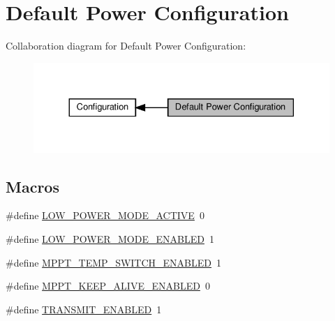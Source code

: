 \hypertarget{group__defines__default__power__configuration}{}\section{Default Power Configuration}
\label{group__defines__default__power__configuration}
Collaboration diagram for Default Power Configuration\+:
\nopagebreak
\begin{figure}[H]
\begin{center}
\leavevmode
\includegraphics[width=330pt]{group__defines__default__power__configuration}
\end{center}
\end{figure}
\subsection*{Macros}
\begin{DoxyCompactItemize}
\item 
\#define \hyperlink{group__defines__default__power__configuration_gad0d7265d491052179cfbffc68a891cc6}{L\+O\+W\+\_\+\+P\+O\+W\+E\+R\+\_\+\+M\+O\+D\+E\+\_\+\+A\+C\+T\+I\+VE}~0
\item 
\#define \hyperlink{group__defines__default__power__configuration_ga7ce14dbd42484c75f63fb7557f9d133a}{L\+O\+W\+\_\+\+P\+O\+W\+E\+R\+\_\+\+M\+O\+D\+E\+\_\+\+E\+N\+A\+B\+L\+ED}~1
\item 
\#define \hyperlink{group__defines__default__power__configuration_gac1bce12d866de62b4b9eadcf81f8acb8}{M\+P\+P\+T\+\_\+\+T\+E\+M\+P\+\_\+\+S\+W\+I\+T\+C\+H\+\_\+\+E\+N\+A\+B\+L\+ED}~1
\item 
\#define \hyperlink{group__defines__default__power__configuration_ga06ae8011cff9fec1f6b3720b99f55f62}{M\+P\+P\+T\+\_\+\+K\+E\+E\+P\+\_\+\+A\+L\+I\+V\+E\+\_\+\+E\+N\+A\+B\+L\+ED}~0
\item 
\#define \hyperlink{group__defines__default__power__configuration_ga46d61f94fe26dcb9192435b6c8eaf29d}{T\+R\+A\+N\+S\+M\+I\+T\+\_\+\+E\+N\+A\+B\+L\+ED}~1
\end{DoxyCompactItemize}


